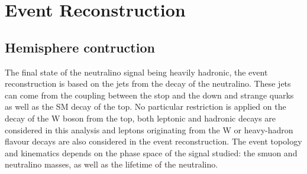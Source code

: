 \documentclass{cernatlasnote}
\begin{document}


    


\newpage
\section{Event Reconstruction}
\label{SEC: EVTREC}
\subsection{Hemisphere contruction}
  The final state of the neutralino signal being heavily hadronic, the event reconstruction is based on the jets from the decay of the neutralino. These jets can come from the coupling between the stop and the down and strange quarks as well as the SM decay of the top. No particular restriction is applied on the decay of the W boson from the top, both leptonic and hadronic decays are considered in this analysis and leptons originating from the W or heavy-hadron flavour decays are also considered in the event reconstruction. The event topology and kinematics depends on the phase space of the signal studied: the smuon and neutralino masses, as well as the lifetime of the neutralino.\\
\end{document}
